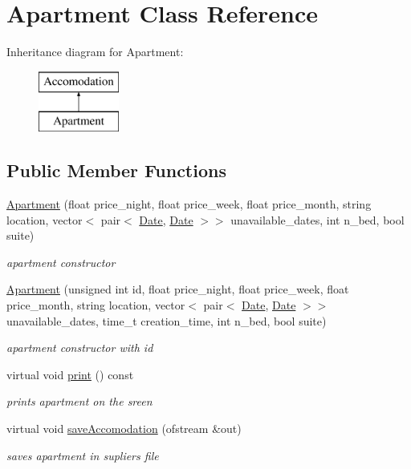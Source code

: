 \hypertarget{class_apartment}{}\section{Apartment Class Reference}
\label{class_apartment}
Inheritance diagram for Apartment\+:\begin{figure}[H]
\begin{center}
\leavevmode
\includegraphics[height=2.000000cm]{class_apartment}
\end{center}
\end{figure}
\subsection*{Public Member Functions}
\begin{DoxyCompactItemize}
\item 
\hyperlink{class_apartment_a8851834df1a78dac09f42f67ab3feef5}{Apartment} (float price\+\_\+night, float price\+\_\+week, float price\+\_\+month, string location, vector$<$ pair$<$ \hyperlink{class_date}{Date}, \hyperlink{class_date}{Date} $>$$>$ unavailable\+\_\+dates, int n\+\_\+bed, bool suite)
\begin{DoxyCompactList}\small\item\em apartment constructor \end{DoxyCompactList}\item 
\hyperlink{class_apartment_a60083e9037386c181e1b3fdabc712c1c}{Apartment} (unsigned int id, float price\+\_\+night, float price\+\_\+week, float price\+\_\+month, string location, vector$<$ pair$<$ \hyperlink{class_date}{Date}, \hyperlink{class_date}{Date} $>$$>$ unavailable\+\_\+dates, time\+\_\+t creation\+\_\+time, int n\+\_\+bed, bool suite)
\begin{DoxyCompactList}\small\item\em apartment constructor with id \end{DoxyCompactList}\item 
\hypertarget{class_apartment_a579261a498031a59514f3a5021a437c1}{}\label{class_apartment_a579261a498031a59514f3a5021a437c1} 
virtual void \hyperlink{class_apartment_a579261a498031a59514f3a5021a437c1}{print} () const
\begin{DoxyCompactList}\small\item\em prints apartment on the sreen \end{DoxyCompactList}\item 
virtual void \hyperlink{class_apartment_af30f7fa6ee2877315b553614dcfad9f2}{save\+Accomodation} (ofstream \&out)
\begin{DoxyCompactList}\small\item\em saves apartment in supliers file \end{DoxyCompactList}\end{DoxyCompactItemize}
